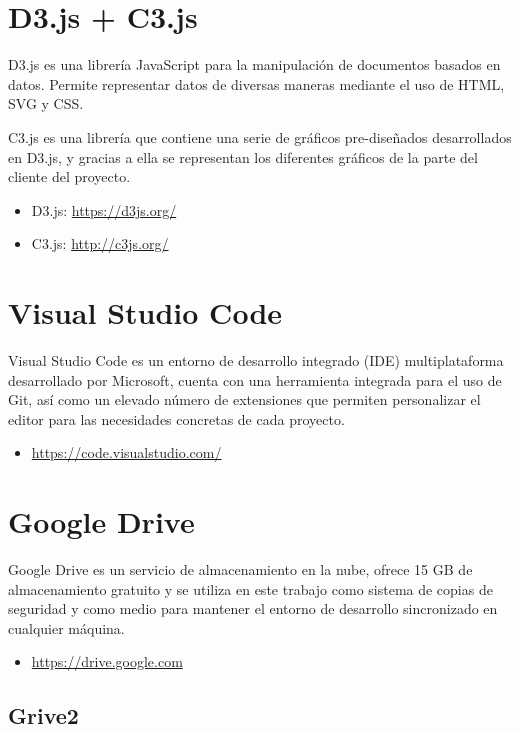 \section{D3.js + C3.js}

D3.js es una librería JavaScript para la manipulación de documentos basados en datos. Permite representar datos de diversas maneras mediante el uso de HTML, SVG y CSS.

C3.js es una librería que contiene una serie de gráficos pre-diseñados desarrollados en D3.js, y gracias a ella se representan los diferentes gráficos de la parte del cliente del proyecto.
 
\begin{itemize}
	\item D3.js: \url{https://d3js.org/}
	\item C3.js: \url{http://c3js.org/}
\end{itemize}

\section{Visual Studio Code}

Visual Studio Code es un entorno de desarrollo integrado (IDE) multiplataforma desarrollado por Microsoft, cuenta con una herramienta integrada para el uso de Git, así como un elevado número de extensiones que permiten personalizar el editor para las necesidades concretas de cada proyecto.

\begin{itemize}
	\item \url{https://code.visualstudio.com/}
\end{itemize}

\section{Google Drive}

Google Drive es un servicio de almacenamiento en la nube, ofrece 15 GB de almacenamiento gratuito y se utiliza en este trabajo como sistema de copias de seguridad y como medio para mantener el entorno de desarrollo sincronizado en cualquier máquina.

\begin{itemize}
	\item \url{https://drive.google.com}
\end{itemize}

\subsection{Grive2}

